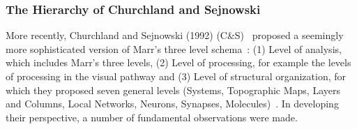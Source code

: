 \documentclass[10pt,letterpaper]{article}
\begin{document}



\subsubsection*{The Hierarchy of Churchland and Sejnowski}

More recently, Churchland and Sejnowski (1992) (C\&S)~\cite{Churchland:1992uq} proposed a seemingly more sophisticated version of Marr's three level schema~\cite{Marr:1982fk}: (1) Level of analysis, which includes Marr’s three levels, (2) Level of processing, for example the levels of processing in the visual pathway and (3) Level of structural organization, for which they proposed seven general levels (Systems, Topographic Maps, Layers and Columns, Local Networks, Neurons, Synapses, Molecules)~\cite{Churchland:1992uq}.  In developing their perspective, a number of fundamental observations were made.
\end{document}
